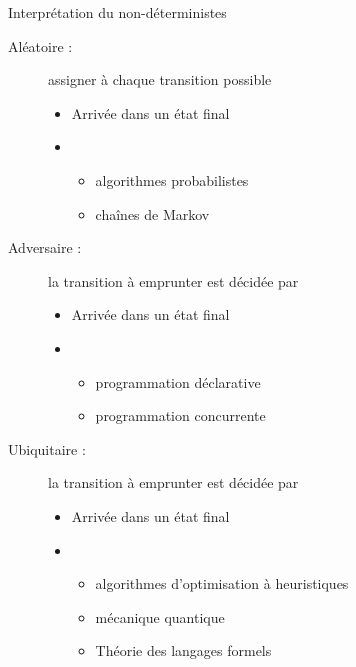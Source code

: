 
\begingroup

\begin{frame}{Interprétation du non-déterministes}

  \begin{description}
  \item[Aléatoire :] assigner  à chaque transition possible
    \begin{itemize}
    \item Arrivée dans un état final 
    \item {} 
      \begin{itemize}
      \item algorithmes probabilistes
      \item chaînes de Markov
      \end{itemize}
    \end{itemize}
  \item[Adversaire :] la transition à emprunter est décidée par 
    \begin{itemize}
    \item Arrivée dans un état final 
    \item {} 
      \begin{itemize}
      \item programmation déclarative
      \item programmation concurrente
      \end{itemize}
    \end{itemize}
  \item[Ubiquitaire :] la transition à emprunter est décidée par 
    \begin{itemize}
    \item Arrivée dans un état final 
    \item {} 
      \begin{itemize}
      \item algorithmes d'optimisation à heuristiques
      \item mécanique quantique
      \item \alert{Théorie des langages formels}
      \end{itemize}
    \end{itemize}
  \end{description}

\end{frame}

\endgroup
